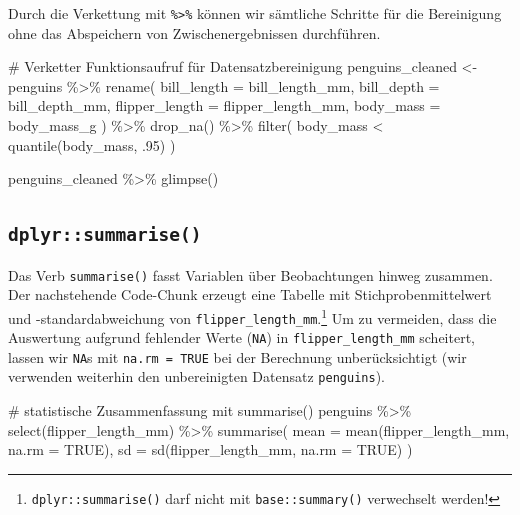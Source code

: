 \documentclass[
  a4paper,
  DIV=11,
  oneside]{scrreprt}
\newenvironment{Shaded}{\begin{snugshade}}{\end{snugshade}}
\newcommand{\NormalTok}[1]{\textcolor[rgb]{0.00,0.23,0.31}{#1}}
\begin{document}
Durch die Verkettung mit \texttt{\%\textgreater{}\%} können wir
sämtliche Schritte für die Bereinigung ohne das Abspeichern von
Zwischenergebnissen durchführen.

\begin{Shaded}
\begin{Highlighting}[]
\NormalTok{\# Verketter Funktionsaufruf für Datensatzbereinigung}
\NormalTok{penguins\_cleaned \textless{}{-} penguins \%\textgreater{}\% }
\NormalTok{  rename(}
\NormalTok{    bill\_length = bill\_length\_mm,}
\NormalTok{    bill\_depth  = bill\_depth\_mm,}
\NormalTok{    flipper\_length = flipper\_length\_mm,}
\NormalTok{    body\_mass = body\_mass\_g}
\NormalTok{  ) \%\textgreater{}\% }
\NormalTok{  drop\_na() \%\textgreater{}\% }
\NormalTok{  filter(}
\NormalTok{    body\_mass \textless{} quantile(body\_mass, .95)}
\NormalTok{  )}

\NormalTok{penguins\_cleaned \%\textgreater{}\% }
\NormalTok{  glimpse()}
\end{Highlighting}
\end{Shaded}

\hypertarget{dplyrsummarise}{%
\subsection{\texorpdfstring{\texttt{dplyr::summarise()}}{dplyr::summarise()}}\label{dplyrsummarise}}

Das Verb \texttt{summarise()} fasst Variablen über Beobachtungen hinweg
zusammen. Der nachstehende Code-Chunk erzeugt eine Tabelle mit
Stichprobenmittelwert und -standardabweichung von
\texttt{flipper\_length\_mm}.\footnote{\texttt{dplyr::summarise()} darf
  nicht mit \texttt{base::summary()} verwechselt werden!} Um zu
vermeiden, dass die Auswertung aufgrund fehlender Werte (\texttt{NA}) in
\texttt{flipper\_length\_mm} scheitert, lassen wir \texttt{NA}s mit
\texttt{na.rm\ =\ TRUE} bei der Berechnung unberücksichtigt (wir
verwenden weiterhin den unbereinigten Datensatz \texttt{penguins}).

\begin{Shaded}
\begin{Highlighting}[]
\NormalTok{\# statistische Zusammenfassung mit \textquotesingle{}summarise()\textquotesingle{}}
\NormalTok{penguins \%\textgreater{}\% }
\NormalTok{  select(flipper\_length\_mm) \%\textgreater{}\% }
\NormalTok{  summarise(}
\NormalTok{    mean = mean(flipper\_length\_mm, na.rm = TRUE), }
\NormalTok{    sd = sd(flipper\_length\_mm, na.rm = TRUE)}
\NormalTok{  )}
\end{Highlighting}
\end{Shaded}
\end{document}
